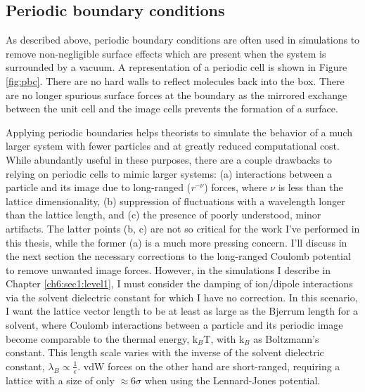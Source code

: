\begin{theory}
  \subsection{\label{ch2:sec3:level3}Periodic boundary conditions}
  As described above, periodic boundary conditions are often used in simulations to remove non-negligible 
  surface effects which are present when the system is surrounded by a vacuum. A representation of a periodic
  cell is shown in Figure \ref{fig:pbc}. There are no hard walls to reflect molecules back into the box. 
  There are no longer spurious surface forces at the boundary as the mirrored exchange between the unit cell 
  and the image cells prevents the formation of a surface. 
  
  Applying periodic boundaries helps theorists to simulate the behavior of a much larger system with fewer
  particles and at greatly reduced computational cost. While abundantly useful in these purposes, there are a
  couple drawbacks to relying on periodic cells to mimic larger systems: (a) interactions between a particle and
  its image due to long-ranged (\emph{r}$^{-\nu}$) forces, where $\nu$ is less than the lattice dimensionality,
  (b) suppression of fluctuations with a wavelength longer than the lattice length, and (c) the presence of poorly
  understood, minor artifacts\cite{shirts2013simple}. The latter points (b, c) are not so critical for the work I've
  performed in this thesis, while the former (a) is a much more pressing concern. I'll discuss in the next 
  section the necessary corrections to the long-ranged Coulomb potential to remove unwanted image forces. 
  However, in the simulations I describe in Chapter \ref{ch6:sec1:level1}, I must consider the damping of 
  ion/dipole interactions via the solvent dielectric constant for which I have no correction. In this scenario,
  I want the lattice vector length to be at least as large as the Bjerrum length for a solvent, where Coulomb
  interactions between a particle and its periodic image become comparable to the thermal energy, k$_{B}$T, 
  with k$_{B}$ as Boltzmann's constant. This length scale varies with the inverse of the solvent dielectric 
  constant, $\lambda_{B} \propto \frac{1}{\epsilon}$. vdW forces on the other hand are short-ranged, requiring
  a lattice with a size of only $\approx$6$\sigma$ when using the Lennard-Jones potential.
  

\end{theory}
